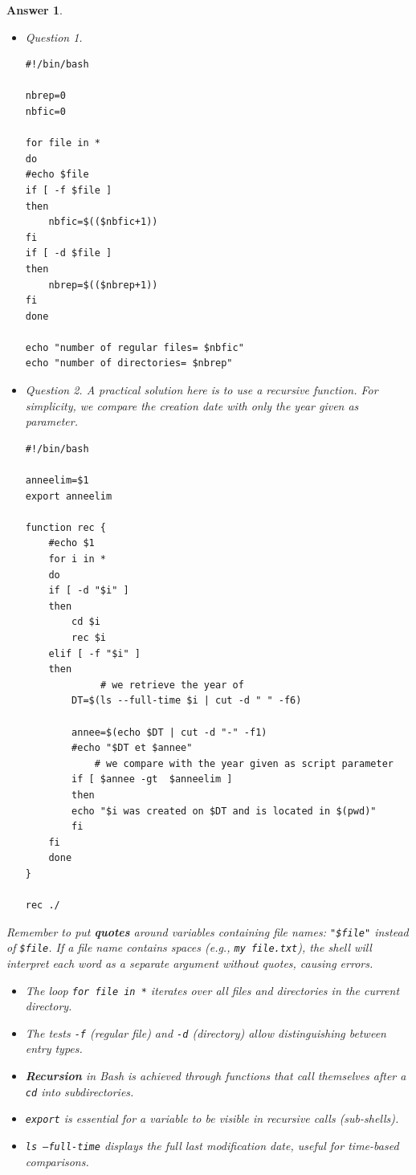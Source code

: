 \documentclass[a4paper,11pt]{article}
\theoremstyle{plain}
\newtheorem{correction}{Answer}
\theoremstyle{definition}
\begin{document}
\begin{correction}
\begin{itemize}
\item Question 1.
\begin{lstlisting}
#!/bin/bash

nbrep=0
nbfic=0

for file in *
do
#echo $file
if [ -f $file ]
then
    nbfic=$(($nbfic+1))
fi
if [ -d $file ]
then
    nbrep=$(($nbrep+1))
fi
done

echo "number of regular files= $nbfic"
echo "number of directories= $nbrep"
\end{lstlisting}

\item Question 2. A practical solution here is to use a recursive function. For simplicity, we compare the creation date with only the year given as parameter.

\begin{lstlisting}
#!/bin/bash

anneelim=$1
export anneelim

function rec {
    #echo $1
    for i in *
    do
	if [ -d "$i" ]
	then
	    cd $i
	    rec $i
	elif [ -f "$i" ]
	then
             # we retrieve the year of
	    DT=$(ls --full-time $i | cut -d " " -f6)

	    annee=$(echo $DT | cut -d "-" -f1)
	    #echo "$DT et $annee"
            # we compare with the year given as script parameter
	    if [ $annee -gt  $anneelim ]
	    then
		echo "$i was created on $DT and is located in $(pwd)"
	    fi
	fi
    done
}

rec ./
\end{lstlisting}
\end{itemize}

\begin{attention}
Remember to put \textbf{quotes} around variables containing file names: \texttt{"\$file"} instead of \texttt{\$file}. If a file name contains spaces (e.g., \texttt{my file.txt}), the shell will interpret each word as a separate argument without quotes, causing errors.
\end{attention}

\begin{pointcle}
\begin{itemize}
    \item The loop \texttt{for file in *} iterates over all files and directories in the current directory.
    \item The tests \texttt{-f} (regular file) and \texttt{-d} (directory) allow distinguishing between entry types.
    \item \textbf{Recursion} in Bash is achieved through functions that call themselves after a \texttt{cd} into subdirectories.
    \item \texttt{export} is essential for a variable to be visible in recursive calls (sub-shells).
    \item \texttt{ls --full-time} displays the full last modification date, useful for time-based comparisons.
\end{itemize}
\end{pointcle}

\end{correction}
\end{document}
